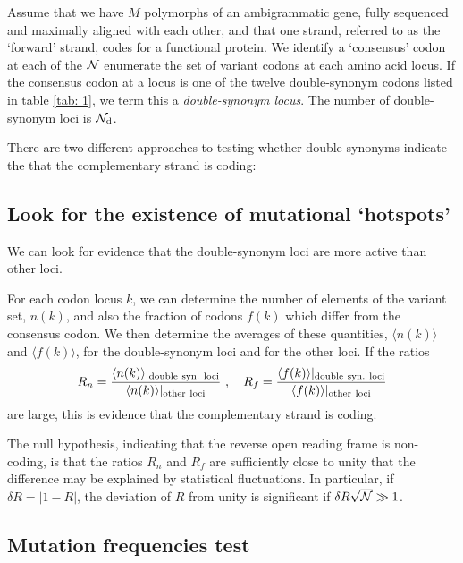 \documentclass[9pt,lineno]{elife}
\newcommand{\MW}[1]{{\color{magenta}{#1}}}
\begin{document}
Assume that we have $M$ polymorphs of an ambigrammatic gene, fully sequenced and 
maximally aligned with each other, and that one strand, referred to as the 
\lq forward' strand, codes for a functional protein. 
We identify a \lq consensus' codon at each of the ${\cal N}$ \MW{loci, 
and then} enumerate the set of variant codons at each amino acid locus. 
If the consensus codon at a locus is one of the twelve 
double-synonym codons listed in table \ref{tab: 1}, we term this a \emph{double-synonym locus}.
The number of double-synonym loci is ${\cal N}_{\rm d}$.

There are two different approaches to testing whether 
double synonyms indicate the that the complementary strand is coding:

\subsection{Look for the existence of mutational \lq hotspots'}
\label{sec: 3.1} 

We can look for evidence that the double-synonym loci are more active than other loci. 

For each codon locus $k$, we can determine the number of elements of the variant set, $n(k)$, 
and also the fraction of codons $f(k)$ which differ from the consensus codon. 
We then determine the averages of these quantities, $\langle n(k)\rangle$ and $\langle f(k)\rangle$, 
for the double-synonym loci and for the other loci. If the ratios
%
\begin{equation}
\label{eq: 3.1}
R_n=\frac{\langle n(k)\rangle\vert_{\rm double\ syn.\ loci}}{\langle n(k)\rangle\vert_{\rm other\ loci}}
\ ,\ \ \ 
R_f=\frac{\langle f(k)\rangle\vert_{\rm double\ syn.\ loci}}{\langle f(k)\rangle\vert_{\rm other\ loci}}
\end{equation}
%
are large, this is evidence that the complementary strand is coding. 

The null hypothesis, indicating that the reverse open reading frame is 
non-coding, is that the ratios $R_n$ and $R_f$ are sufficiently close to 
unity that the difference may be explained by statistical fluctuations. In particular,
if $\delta R=|1-R|$, the deviation of $R$ from unity is significant if 
$\delta R \sqrt{{\cal N}}\gg 1$.

\subsection{Mutation frequencies test}
\label{sec: 3.2}
\end{document}
